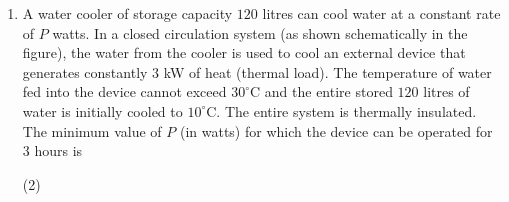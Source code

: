 \documentclass{article}
\begin{document}
\begin{enumerate}
    \item A water cooler of storage capacity \( 120 \) litres can cool water at a constant rate of \( P \) watts. In a closed circulation system (as shown schematically in the figure), the water from the cooler is used to cool an external device that generates constantly \( 3 \) kW of heat (thermal load). The temperature of water fed into the device cannot exceed \( 30^\circ\text{C} \) and the entire stored \( 120 \) litres of water is initially cooled to \( 10^\circ\text{C} \). The entire system is thermally insulated. The minimum value of \( P \) (in watts) for which the device can be operated for \( 3 \) hours is
        \begin{tasks}(2)
        \end{tasks}
\end{enumerate}

\begin{center}
\end{center}
\end{document}
